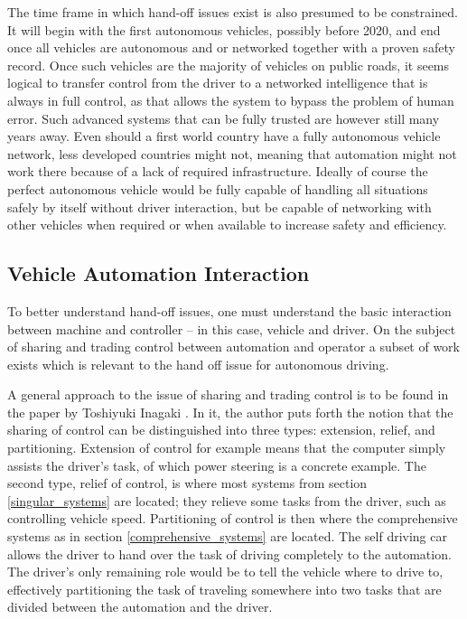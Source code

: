 \documentclass{acm_proc_article-sp}
\begin{document}
The time frame in which hand-off issues exist is also presumed to be constrained.
It will begin with the first autonomous vehicles, possibly before 2020, and end once all vehicles are autonomous and or networked together with a proven safety record.
Once such vehicles are the majority of vehicles on public roads, it seems logical to transfer control from the driver to a networked intelligence that is always in full control, as that allows the system to bypass the problem of human error.
Such advanced systems that can be fully trusted are however still many years away.
Even should a first world country have a fully autonomous vehicle network, less developed countries might not, meaning that automation might not work there because of a lack of required infrastructure.
Ideally of course the perfect autonomous vehicle would be fully capable of handling all situations safely by itself without driver interaction, but be capable of networking with other vehicles when required or when available to increase safety and efficiency.

\subsection{Vehicle Automation Interaction}

To better understand hand-off issues, one must understand the basic interaction between machine and controller – in this case, vehicle and driver.
On the subject of sharing and trading control between automation and operator a subset of work exists which is relevant to the hand off issue for autonomous driving.

A general approach to the issue of sharing and trading control is to be found in the paper by Toshiyuki Inagaki \cite{inagaki:adaptive}.
In it, the author puts forth the notion that the sharing of control can be distinguished into three types: extension, relief, and partitioning.
Extension of control for example means that the computer simply assists the driver's task, of which power steering is a concrete example.
The second type, relief of control, is where most systems from section \ref{singular_systems} are located; they relieve some tasks from the driver, such as controlling vehicle speed.
Partitioning of control is then where the comprehensive systems as in section \ref{comprehensive_systems} are located.
The self driving car allows the driver to hand over the task of driving completely to the automation.
The driver's only remaining role would be to tell the vehicle where to drive to, effectively partitioning the task of traveling somewhere into two tasks that are divided between the automation and the driver.
\end{document}
